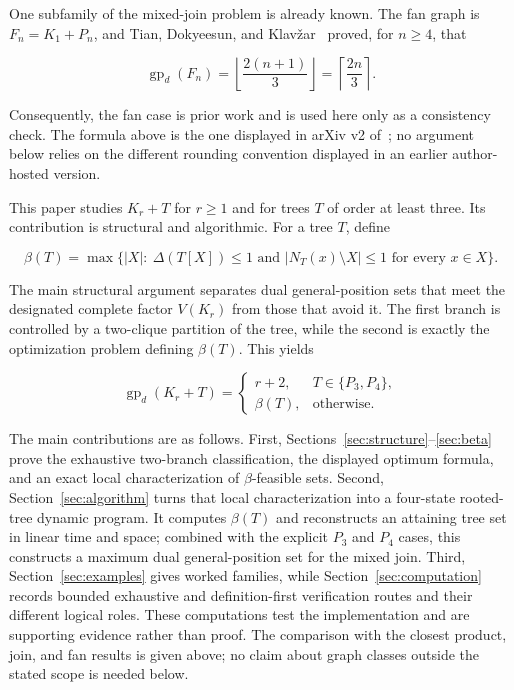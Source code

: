 \documentclass[preprint,12pt]{elsarticle}
\numberwithin{equation}{section}
\begin{document}
One subfamily of the mixed-join problem is already known. The fan graph
is \(F_n=K_1+P_n\), and Tian, Dokyeesun, and Klav\v{z}ar~\cite[arXiv v2]{tian-et-al-removal}
proved, for \(n\ge 4\), that

\nopagebreak[4]
\[
\operatorname{gp}_d(F_n)
=\left\lfloor\frac{2(n+1)}{3}\right\rfloor
=\left\lceil\frac{2n}{3}\right\rceil.
\]

Consequently, the fan case is prior work and is used here only as a
consistency check. The formula above is the one displayed in arXiv v2
of~\cite{tian-et-al-removal}; no argument below relies on the different
rounding convention displayed in an earlier author-hosted version.

This paper studies \(K_r+T\) for \(r\ge 1\) and for trees \(T\) of order
at least three. Its contribution is structural and algorithmic. For a tree
\(T\), define

\[
\beta(T)=\max\bigl\{|X|:\ \Delta(T[X])\le 1
\text{ and } |N_T(x)\setminus X|\le 1\text{ for every }x\in X\bigr\}.
\]

The main structural argument separates dual general-position sets that
meet the designated complete factor \(V(K_r)\) from those that avoid it. The first
branch is controlled by a two-clique partition of the tree, while the
second is exactly the optimization problem defining \(\beta(T)\). This
yields

\[
\operatorname{gp}_d(K_r+T)=
\begin{cases}
r+2, & T\in\{P_3,P_4\},\\
\beta(T), & \text{otherwise}.
\end{cases}
\]

The main contributions are as follows. First,
Sections~\ref{sec:structure}--\ref{sec:beta} prove the exhaustive two-branch
classification, the displayed optimum formula, and an exact local
characterization of \(\beta\)-feasible sets. Second,
Section~\ref{sec:algorithm} turns that local characterization into a
four-state rooted-tree dynamic program. It computes \(\beta(T)\) and
reconstructs an attaining tree set in linear time and space; combined with the
explicit \(P_3\) and \(P_4\) cases, this constructs a maximum dual
general-position set for the mixed join. Third,
Section~\ref{sec:examples} gives worked families, while
Section~\ref{sec:computation} records bounded exhaustive and definition-first
verification routes and their different logical roles. These computations
test the implementation and are supporting evidence rather than proof. The
comparison with the closest product, join, and fan results is given above; no
claim about graph classes outside the stated scope is needed below.
\end{document}
